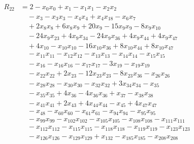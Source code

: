 \begin{align*}
R_{22}&={}2 -x_{0}x_{0} +x_{1} -x_{1}x_{1} -x_{2}x_{2}\\
&\quad{}-x_{3} -x_{3}x_{3} -x_{4}x_{4} +x_{4}x_{18} -x_{6}x_{7}\\
&\quad{}+2x_{8}x_{8} +6x_{8}x_{9} +20x_{9} -15x_{9}x_{9} -8x_{9}x_{10}\\
&\quad{}-24x_{9}x_{23} +4x_{9}x_{34} -24x_{9}x_{36} +4x_{9}x_{44} +4x_{9}x_{47}\\
&\quad{}+4x_{10} -x_{10}x_{10} -16x_{10}x_{36} +8x_{10}x_{44} +8x_{10}x_{47}\\
&\quad{}-x_{11}x_{11} -x_{12}x_{12} -x_{13}x_{13} -x_{14}x_{14} -x_{15}x_{15}\\
&\quad{}-x_{16} -x_{16}x_{16} -x_{17}x_{17} -3x_{19} -x_{19}x_{19}\\
&\quad{}-x_{22}x_{22} +2x_{23} -12x_{23}x_{23} -8x_{23}x_{36} -x_{26}x_{26}\\
&\quad{}-x_{28}x_{28} -x_{30}x_{30} -x_{32}x_{32} +3x_{34}x_{34} -x_{35}\\
&\quad{}-x_{35}x_{35} +4x_{36} -4x_{36}x_{36} +x_{37} -x_{38}x_{38}\\
&\quad{}-x_{41}x_{41} +2x_{43} +4x_{44}x_{44} -x_{45} +4x_{47}x_{47}\\
&\quad{}-x_{48} -x_{60}x_{60} -x_{61}x_{61} -x_{94}x_{94} -x_{95}x_{95}\\
&\quad{}-x_{99}x_{99} -x_{102}x_{102} -x_{105}x_{105} -x_{108}x_{108} -x_{111}x_{111}\\
&\quad{}-x_{112}x_{112} -x_{115}x_{115} -x_{118}x_{118} -x_{119}x_{119} -x_{123}x_{123}\\
&\quad{}-x_{126}x_{126} -x_{129}x_{129} +x_{132} -x_{185}x_{185} -x_{208}x_{208}
\end{align*}
